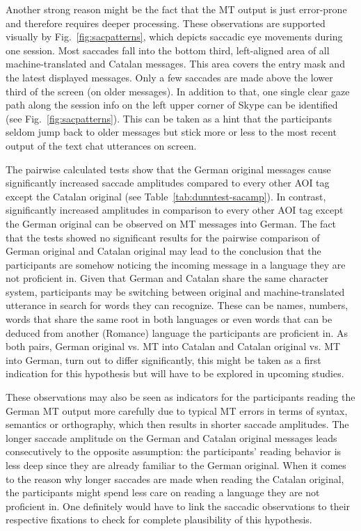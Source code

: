 \documentclass[output=paper,colorlinks,citecolor=brown]{langscibook}
\begin{document}
Another strong reason might be the fact that the MT output is just error-prone and therefore requires deeper processing. These observations are supported visually by Fig.~\ref{fig:sacpatterns}, which depicts saccadic eye movements during one session. Most saccades fall into the bottom third, left-aligned area of all machine-translated and Catalan messages. This area covers the entry mask and the latest displayed messages. Only a few saccades are made above the lower third of the screen (on older messages). In addition to that, one single clear gaze path along the session info on the left upper corner of Skype can be identified (see Fig.~\ref{fig:sacpatterns}). This can be taken as a hint that the participants seldom jump back to older messages but stick more or less to the most recent output of the text chat utterances on screen.

The pairwise calculated tests show that the German original messages cause significantly increased saccade amplitudes compared to every other AOI tag except the Catalan original (see Table~\ref{tab:dunntest-sacamp}). In contrast, significantly increased amplitudes in comparison to every other AOI tag except the German original can be observed on MT messages into German. The fact that the tests showed no significant results for the pairwise comparison of German original and Catalan original may lead to the conclusion that the participants are somehow noticing the incoming message in a language they are not proficient in. Given that German and Catalan share the same character system, participants may be switching between original and machine-translated utterance in search for words they can recognize. These can be names, numbers, words that share the same root in both languages or even words that can be deduced from another (Romance) language the participants are proficient in. As both pairs, German original vs. MT into Catalan and Catalan original vs. MT into German, turn out to differ significantly, this might be taken as a first indication for this hypothesis but will have to be explored in upcoming studies.

These observations may also be seen as indicators for the participants reading the German MT output more carefully due to typical MT errors in terms of syntax, semantics or orthography, which then results in shorter saccade amplitudes. The longer saccade amplitude on the German and Catalan original messages leads consecutively to the opposite assumption: the participants' reading behavior is less deep since they are already familiar to the German original. When it comes to the reason why longer saccades are made when reading the Catalan original, the participants might spend less care on reading a language they are not proficient in. One definitely would have to link the saccadic observations to their respective fixations to check for complete plausibility of this hypothesis.
\end{document}
